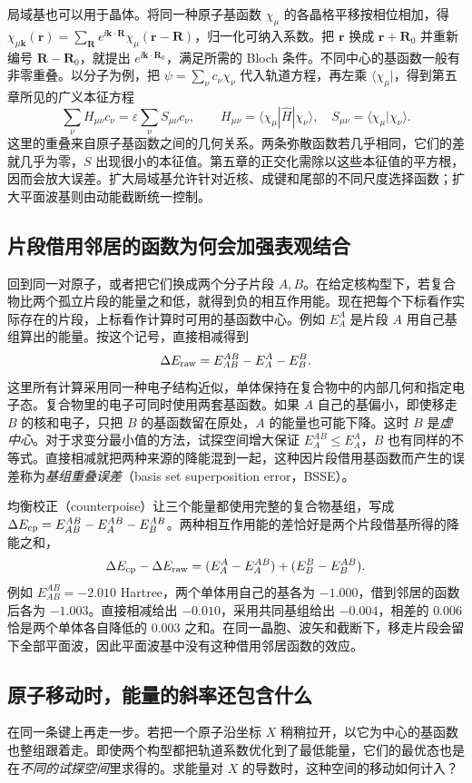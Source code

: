 局域基也可以用于晶体。将同一种原子基函数 $\chi_\mu$ 的各晶格平移按相位相加，得 $\chi_{\mu\bm k}(\bm r)=\sum_{\bm R}e^{\ii\bm k\cdot\bm R}\chi_\mu(\bm r-\bm R)$，归一化可纳入系数。把 $\bm r$ 换成 $\bm r+\bm R_0$ 并重新编号 $\bm R-\bm R_0$，就提出 $e^{\ii\bm k\cdot\bm R_0}$，满足所需的 Bloch 条件。不同中心的基函数一般有非零重叠。以分子为例，把 $\psi=\sum_\nu c_\nu\chi_\nu$ 代入轨道方程，再左乘 $\langle\chi_\mu|$，得到第五章所见的广义本征方程
\[
 \sum_\nu H_{\mu\nu}c_\nu=\varepsilon\sum_\nu S_{\mu\nu}c_\nu,\qquad
 H_{\mu\nu}=\langle\chi_\mu|\hat H|\chi_\nu\rangle,\quad
 S_{\mu\nu}=\langle\chi_\mu|\chi_\nu\rangle .
\]
这里的重叠来自原子基函数之间的几何关系。两条弥散函数若几乎相同，它们的差就几乎为零，$S$ 出现很小的本征值。第五章的正交化需除以这些本征值的平方根，因而会放大误差。扩大局域基允许针对近核、成键和尾部的不同尺度选择函数；扩大平面波基则由动能截断统一控制。

\subsection{片段借用邻居的函数为何会加强表观结合}\label{solids:bsse}
回到同一对原子，或者把它们换成两个分子片段 $A,B$。在给定核构型下，若复合物比两个孤立片段的能量之和低，就得到负的相互作用能。现在把每个下标看作实际存在的片段，上标看作计算时可用的基函数中心。例如 $E_A^A$ 是片段 $A$ 用自己基组算出的能量。按这个记号，直接相减得到
\[
 \Delta E_{\rm raw}=E_{AB}^{AB}-E_A^A-E_B^B .
\]
这里所有计算采用同一种电子结构近似，单体保持在复合物中的内部几何和指定电子态。复合物里的电子可同时使用两套基函数。如果 $A$ 自己的基偏小，即使移走 $B$ 的核和电子，只把 $B$ 的基函数留在原处，$A$ 的能量也可能下降。这时 $B$ 是\emph{虚中心}。对于求变分最小值的方法，试探空间增大保证 $E_A^{AB}\le E_A^A$，$B$ 也有同样的不等式。直接相减就把两种来源的降能混到一起，这种因片段借用基函数而产生的误差称为\emph{基组重叠误差}（basis set superposition error，BSSE）。

均衡校正（counterpoise）让三个能量都使用完整的复合物基组，写成 $\Delta E_{\rm cp}=E_{AB}^{AB}-E_A^{AB}-E_B^{AB}$。两种相互作用能的差恰好是两个片段借基所得的降能之和，
\[
 \Delta E_{\rm cp}-\Delta E_{\rm raw}
 =(E_A^A-E_A^{AB})+(E_B^B-E_B^{AB}).
\]
例如 $E_{AB}^{AB}=-2.010$ Hartree，两个单体用自己的基各为 $-1.000$，借到邻居的函数后各为 $-1.003$。直接相减给出 $-0.010$，采用共同基组给出 $-0.004$，相差的 $0.006$ 恰是两个单体各自降低的 $0.003$ 之和。在同一晶胞、波矢和截断下，移走片段会留下全部平面波，因此平面波基中没有这种借用邻居函数的效应。

\subsection{原子移动时，能量的斜率还包含什么}\label{solids:pulay}
在同一条键上再走一步。若把一个原子沿坐标 $X$ 稍稍拉开，以它为中心的基函数也整组跟着走。即使两个构型都把轨道系数优化到了最低能量，它们的最优态也是在\emph{不同的试探空间}里求得的。求能量对 $X$ 的导数时，这种空间的移动如何计入？

